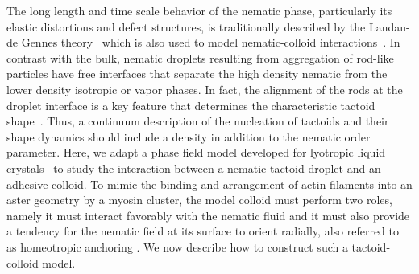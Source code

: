 \documentclass[%
 aip,
 amsmath,amssymb,
 reprint,%
]{revtex4-1}
\begin{document}
The long length and time scale behavior of the nematic phase, particularly its elastic distortions and defect structures, is traditionally described by the Landau-de Gennes theory~\cite{DeGennesText} which is also used to model nematic-colloid interactions~\cite{Ravnik09}. In contrast with the bulk, nematic droplets resulting from aggregation of rod-like particles have free interfaces that separate the high density nematic from the lower density isotropic or vapor phases. In fact, the alignment of the rods at the droplet interface is a key feature that determines the characteristic tactoid shape~\cite{vdS03}. Thus, a continuum description of the nucleation of tactoids and their shape dynamics should include a density in addition to the nematic order parameter. Here, we adapt a phase field model developed for lyotropic liquid crystals~\cite{Lowen10,Lowen11} to study the interaction between a nematic tactoid droplet and an adhesive colloid. To mimic the binding and arrangement of actin filaments into an aster geometry by a myosin cluster, the model colloid must perform two roles, namely it must interact favorably with the nematic fluid and it must also provide a tendency for the nematic field at its surface to orient radially, also referred to as homeotropic anchoring \cite{Smalyukh18}. We now describe how to construct such a tactoid-colloid model.
\end{document}
